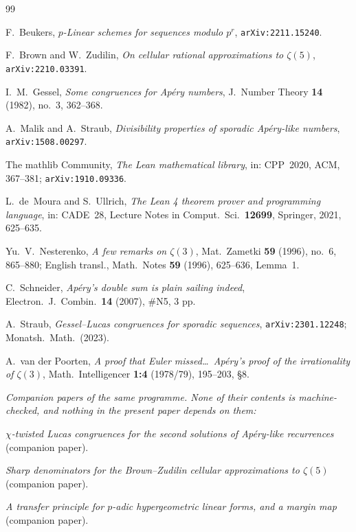 \documentclass[11pt,reqno]{amsart}
\theoremstyle{plain}
\theoremstyle{definition}
\theoremstyle{remark}
\numberwithin{equation}{section}
\begin{document}
\begin{thebibliography}{99}
\small

F.~Beukers, \emph{$p$-Linear schemes for sequences modulo $p^r$}, \texttt{arXiv:2211.15240}.

F.~Brown and W.~Zudilin, \emph{On cellular rational approximations to $\zeta(5)$},
\texttt{arXiv:2210.03391}.

I.~M.~Gessel, \emph{Some congruences for Ap\'ery numbers}, J.\ Number Theory \textbf{14}
(1982), no.~3, 362--368.

A.~Malik and A.~Straub, \emph{Divisibility properties of sporadic Ap\'ery-like numbers},
\texttt{arXiv:1508.00297}.

The mathlib Community, \emph{The Lean mathematical library}, in: CPP~2020, ACM, 367--381;
\texttt{arXiv:1910.09336}.

L.~de~Moura and S.~Ullrich, \emph{The Lean 4 theorem prover and programming language},
in: CADE~28, Lecture Notes in Comput.\ Sci.\ \textbf{12699}, Springer, 2021, 625--635.

Yu.~V.~Nesterenko, \emph{A few remarks on $\zeta(3)$}, Mat.\ Zametki \textbf{59} (1996),
no.~6, 865--880; English transl., Math.\ Notes \textbf{59} (1996), 625--636, Lemma~1.

C.~Schneider, \emph{Ap\'ery's double sum is plain sailing indeed}, Electron.\ J.\ Combin.\
\textbf{14} (2007), \#N5, 3 pp.

A.~Straub, \emph{Gessel--Lucas congruences for sporadic sequences},
\texttt{arXiv:2301.12248}; Monatsh.\ Math.\ (2023).

A.~van der Poorten, \emph{A proof that Euler missed\dots\ Ap\'ery's proof of the
irrationality of $\zeta(3)$}, Math.\ Intelligencer \textbf{1:4} (1978/79), 195--203, \S8.

\medskip
\noindent\emph{Companion papers of the same programme. None of their contents is
machine-checked, and nothing in the present paper depends on them:}

\emph{$\chi$-twisted Lucas congruences for the second solutions of Ap\'ery-like recurrences}
(companion paper).

\emph{Sharp denominators for the Brown--Zudilin cellular approximations to $\zeta(5)$}
(companion paper).

\emph{A transfer principle for $p$-adic hypergeometric linear forms, and a margin map}
(companion paper).

\end{thebibliography}
\end{document}
